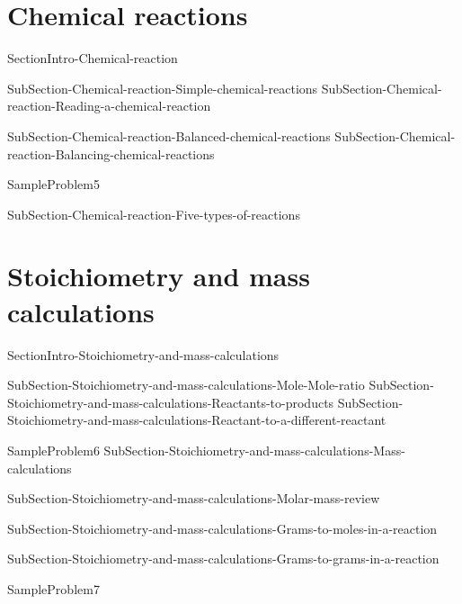 \documentclass[main.tex]{subfiles}
\newcommand\chapterlabel{Ch-mole}\setcounter{figurenewcounter}{0}\setcounter{tablenewcounter}{0}\setcounter{formulanewcounter}{0}
\begin{document}
\section{Chemical reactions}
{SectionIntro-Chemical-reaction}

\sloppy\begin{description}


{SubSection-Chemical-reaction-Simple-chemical-reactions}
{SubSection-Chemical-reaction-Reading-a-chemical-reaction}




{SubSection-Chemical-reaction-Balanced-chemical-reactions}
{SubSection-Chemical-reaction-Balancing-chemical-reactions}





{SampleProblem5}


{SubSection-Chemical-reaction-Five-types-of-reactions}


\end{description}



\section{Stoichiometry and mass calculations}
{SectionIntro-Stoichiometry-and-mass-calculations}


\sloppy \begin{description}

{SubSection-Stoichiometry-and-mass-calculations-Mole-Mole-ratio}
{SubSection-Stoichiometry-and-mass-calculations-Reactants-to-products}
{SubSection-Stoichiometry-and-mass-calculations-Reactant-to-a-different-reactant}








{SampleProblem6}
{SubSection-Stoichiometry-and-mass-calculations-Mass-calculations}

{SubSection-Stoichiometry-and-mass-calculations-Molar-mass-review}


{SubSection-Stoichiometry-and-mass-calculations-Grams-to-moles-in-a-reaction}




{SubSection-Stoichiometry-and-mass-calculations-Grams-to-grams-in-a-reaction}


{SampleProblem7}

\end{description}
\end{document}
